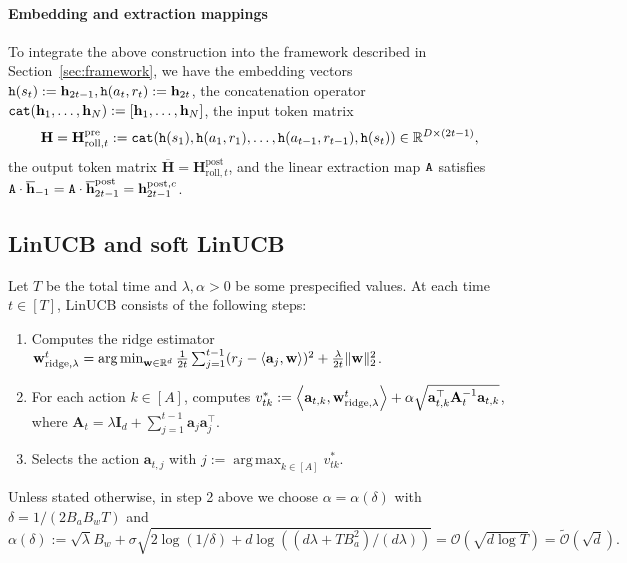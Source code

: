 \documentclass[10pt]{article}
\renewcommand{\bar}{\overline}
\newcommand{\id}{\bI}
\DeclareMathOperator*{\argmin}{arg\,min}
\DeclareMathOperator*{\argmax}{arg\,max}
\renewcommand{\cO}{\mathcal{O}}
\newcommand{\<}{\left\langle}
\renewcommand{\>}{\right\rangle}
\newcommand{\ridge}{{\rm ridge}}
\newcommand{\R}{\mathbb{R}}
\newcommand{\pre}{{\mathrm{pre}}}
\newcommand{\post}{{\mathrm{post}}}
\newcommand{\partc}{{c}}
\newcommand{\cwid}{{\alpha}}
\newcommand{\tcO}{{\tilde{\mathcal O}}}
\newcommand{\state}{{s}}
\newcommand{\action}{{a}}
\newcommand{\reward}{{r}}
\newcommand{\totlen}{{T}}
\newcommand{\cat}{{\tt cat}}
\newcommand{\extractmap}{{\tt A}}
\newcommand{\embedmap}{{\tt h}}
\newcommand{\roll}{{\mathrm{roll}}}
\def\bA{{\mathbf A}}
\def\bH{{\mathbf H}}
\def\bI{{\mathbf I}}
\def\ba{{\mathbf a}}
\def\bh{{\mathbf h}}
\def\bw{{\mathbf w}}
\begin{document}
\paragraph{Embedding and extraction mappings}
To integrate the above construction into the  framework described in Section~\ref{sec:framework},  we have the embedding vectors $\embedmap(\state_t):=\bh_{2t-1},\embedmap(\action_t,\reward_t):=\bh_{2t}$,  the concatenation operator $\cat(\bh_1, \ldots, \bh_N): = [\bh_1, \ldots, \bh_N]$, the input token matrix  $$\bH=\bH^\pre_{\roll,t}: = \cat(\embedmap(\state_1), \embedmap(\action_1, \reward_1), \ldots, \embedmap(\action_{t-1}, \reward_{t-1}), \embedmap(\state_t)) \in \R^{D \times (2t-1)},$$ the output token matrix $\bar{\bH}=\bH^\post_{\roll,t}$, and the linear extraction map $\extractmap$  satisfies $\extractmap\cdot\bar{\bh}_{-1}=\extractmap\cdot\bar{\bh}^\post_{2t-1}=\bh^{\post,\partc}_{2t-1}$.













































\subsection{LinUCB and soft LinUCB}\label{sec:soft-LinUCB}
Let $T$ be the total time and $\lambda,\cwid>0$ be some prespecified values. At each time $t\in[T]$, LinUCB consists of the following steps:
\begin{enumerate}
    \item Computes the ridge estimator $\bw^t_{\ridge,\lambda}=\argmin_{\bw\in\R^d}\frac{1}{2t}\sum_{j=1}^{t-1}(r_j-\<\ba_j,\bw\>)^2+\frac{\lambda}{2t}\|\bw\|_2^2$.
    \item For each action $k\in[A]$, computes $v^*_{tk}:=\<\ba_{t,k},\bw^t_{\ridge,\lambda}\>+\cwid\sqrt{\ba_{t,k}^\top \bA_{t}^{-1}  \ba_{t,k}}$, where $\bA_t=\lambda\id_d+\sum_{j=1}^{t-1}\ba_j\ba_j^\top$.
    \item Selects the action $\ba_{t,j}$ with $j:=\argmax_{k\in[A]}v^*_{tk}$.
\end{enumerate}
Unless stated otherwise, in step 2 above we choose $\alpha=\alpha(\delta)$ with $\delta=1/(2B_aB_wT)$ and $$\cwid(\delta):=\sqrt{\lambda}B_w+\sigma\sqrt{2\log(1/\delta)+d\log((d\lambda+TB_a^2)/(d\lambda))}=\cO(\sqrt{d\log \totlen})=\tcO(\sqrt{d}).$$
\end{document}

